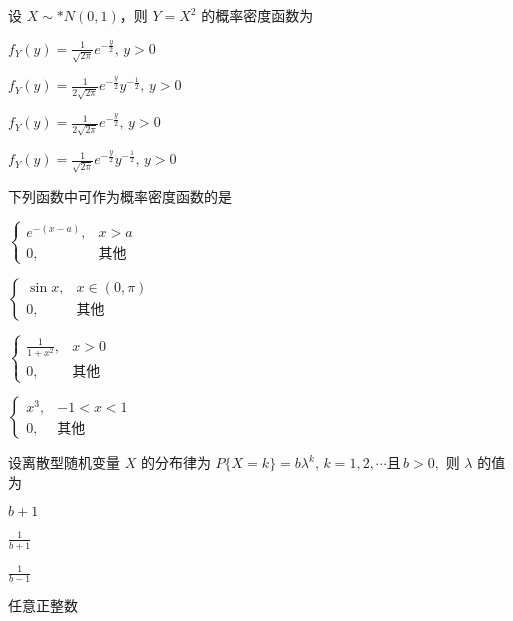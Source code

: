 \documentclass{exam-zh}
\begin{document}
\begin{question}
  设 $X \sim* N(0,1)$，则 $Y = X^2$ 的概率密度函数为 \paren[D]
  \begin{choices}
    \item $f_Y(y) = \frac{1}{\sqrt{2\pi}} e^{-\frac{y}{2}}, \, y > 0$  
    \item $f_Y(y) = \frac{1}{2\sqrt{2\pi}} e^{-\frac{y}{2}} y^{-\frac{1}{2}}, \, y > 0$  
    \item $f_Y(y) = \frac{1}{2\sqrt{2\pi}} e^{-\frac{y}{2}}, \, y > 0$  
    \item $f_Y(y) = \frac{1}{\sqrt{2\pi}} e^{-\frac{y}{2}} y^{-\frac{1}{2}}, \, y > 0$  
  \end{choices}
\end{question}

\begin{question}
  下列函数中可作为概率密度函数的是 \paren[A]
  \begin{choices}
    \item 
    $
    \begin{cases}  
    e^{-(x-a)}, & x > a \\  
    0, & \text{其他}  
    \end{cases}
    $  
    
    \item 
    $
    \begin{cases}  
    \sin x, & x \in (0, \pi) \\  
    0, & \text{其他}  
    \end{cases}
    $  
    
    \item 
    $
    \begin{cases}  
    \frac{1}{1+x^2}, & x > 0 \\  
    0, & \text{其他}  
    \end{cases}
    $  
    
    \item 
    $
    \begin{cases}  
    x^3, & -1 < x < 1 \\  
    0, & \text{其他}  
    \end{cases}
    $  
  \end{choices}
\end{question}

\begin{question}
  设离散型随机变量 $X$ 的分布律为  
  $P\{X = k\} = b \lambda^k, \, k = 1, 2, \cdots \text{且} \, b > 0,$  
  则 $\lambda$ 的值为 \paren[B]
  \begin{choices}
    \item $b + 1$  
    \item $\frac{1}{b + 1}$  
    \item $\frac{1}{b - 1}$  
    \item 任意正整数  
  \end{choices}
\end{question}
\end{document}
